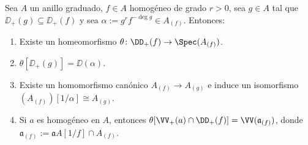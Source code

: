 \begin{prop}
	Sea $A$ un anillo graduado, $f \in A$ homogéneo de grado $r > 0$, sea $g \in A$ tal que $\DD_+(g) \subseteq \DD_+(f )$
	y sea $\alpha := g^r f^{-\deg g} \in A_{(f)}$. Entonces:
	\begin{enumerate}
		\item Existe un homeomorfismo $\theta \colon \DD_+(f ) \to \Spec(A_{(f)})$.
		\item $\theta[\DD_+(g)] = \DD(\alpha)$.
		\item Existe un homomorfismo canónico $A_{(f)} \to A_{(g)}$ e induce un isomorfismo $(A_{(f)} )[1/\alpha] \cong A_{(g)}$.
		\item Si $a$ es homogéneo en $A$, entonces $\theta[\VV_+(a) \cap \DD_+(f )] = \VV( \mathfrak{a}_{(f)} )$,
			donde $\mathfrak{a}_{(f)} := \mathfrak{a} A[1/f ] \cap A_{(f)}$.
	\end{enumerate}
\end{prop}

